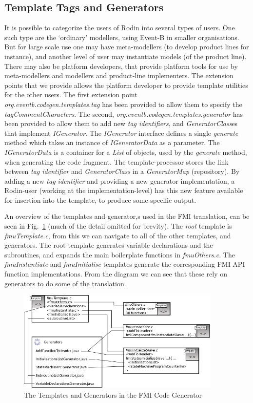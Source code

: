 \documentclass{llncs}%
\begin{document}
\subsection{Template Tags and Generators}
It is possible to categorize the users of Rodin into several types of users. One such type are the `ordinary' modellers, using Event-B in smaller organisations. But for large scale use one may have meta-modellers (to develop product lines for instance), and another level of user may instantiate models (of the product line). There may also be platform developers, that provide platform tools for use by meta-modellers and modellers and product-line implementers. The extension points that we provide allows the platform developer to provide template utilities for the other users. The first extension point \\ \emph{org.eventb.codegen.templates.tag} has been provided to allow them to specify the \emph{tagCommentCharacters}. The second, \emph{org.eventb.codegen.templates.generator} has been provided to allow them to add new \emph{tag identifiers}, and \emph{GeneratorClass}es that implement \emph{IGenerator}. The \emph{IGenerator} interface defines a single \emph{generate} method which takes an instance of \emph{IGeneratorData} as a parameter. The \emph{IGeneratorData}  is a container for  a \emph{List} of objects, used by the \emph{generate} method, when generating the code fragment. The template-processor stores the link between \emph{tag identifier} and \emph{GeneratorClass} in a \emph{GeneratorMap} (repository). By adding a new \emph{tag identifier} and providing a new generator implementation, a Rodin-user (working at the implementation-level) has this new feature available for insertion into the template, to produce some specific output. 

An overview of the  templates and generator,s used in the FMI translation, can be seen in Fig.~\ref{fig:templateStructure} (much of the detail omitted for brevity). The \emph{root} template is \emph{fmuTemplate.c}, from this we can navigate to all of the other templates, and generators. The root template generates variable declarations and the subroutines, and expands the main boilerplate functions in \emph{fmuOthers.c}. The \emph{fmuInstantiate} and \emph{fmuInitialise} templates generate the corresponding FMI API function implementations. From the diagram we can see that these rely on generators to do some of the translation.
%
\begin{figure}
\centering
\includegraphics[width=0.9\textwidth]{templateStructure.png}
\caption{The Templates and Generators in the FMI Code Generator}
\label{fig:templateStructure}
\end{figure}
%
\end{document}
